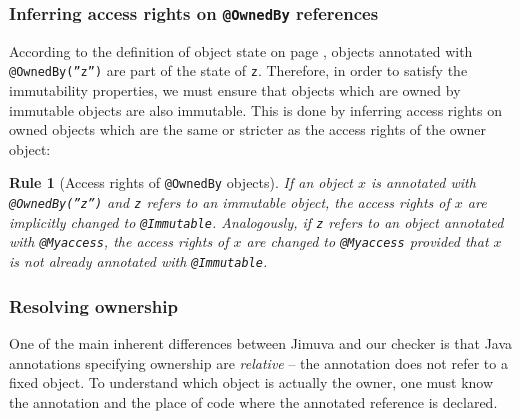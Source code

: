 \documentclass{pracamgr}
\theoremstyle{break}
\theoremstyle{break}
\theoremstyle{break}
\newtheorem{verrule}{Rule}
\begin{document}
\subsubsection{Inferring access rights on \texttt{@OwnedBy} references} 

According to the definition of object state on page
\pageref{def:state}, objects annotated with \texttt{@OwnedBy(''z'')}
are part of the state of \texttt{z}. Therefore, in order to satisfy
the immutability properties, we must ensure that objects which are
owned by immutable objects are also immutable. This is done by
inferring access rights on owned objects which are the same or
stricter as the access rights of the owner object:

\begin{verrule}[Access rights of \texttt{@OwnedBy} objects]
  If an object $x$ is annotated with \texttt{@OwnedBy(''z'')} and
  \texttt{z} refers to an immutable object, the access rights of $x$
  are implicitly changed to \texttt{@Immutable}. Analogously, if
  \texttt{z} refers to an object annotated with \texttt{@Myaccess},
  the access rights of $x$ are changed to \texttt{@Myaccess} provided
  that $x$ is not already annotated with \texttt{@Immutable}.
\end{verrule}
\vspace{-0.7cm}

\subsubsection{Resolving ownership} 

One of the main inherent differences between Jimuva and our checker is
that Java annotations specifying ownership are \emph{relative} -- the
annotation does not refer to a fixed object. To understand which
object is actually the owner, one must know the annotation and the
place of code where the annotated reference is declared.
\end{document}
